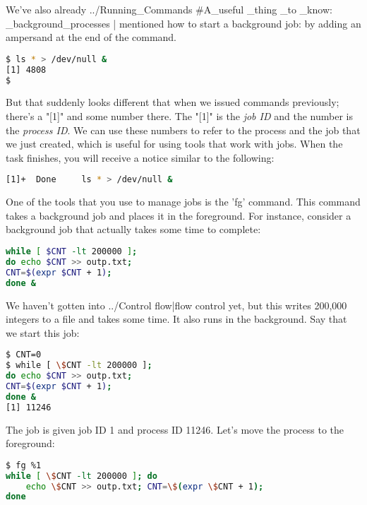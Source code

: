 We've also already ../Running\_Commands \#A\_useful \_thing \_to \_know:
\_background\_processes | mentioned how to start a background job: by adding an
ampersand at the end of the command.
\lstset{basicstyle=\scriptsize, numbers=left, captionpos=b, tabsize=4}
\begin{lstlisting}[caption=Creating a background job,language={bash},
xleftmargin=15pt,label=lst:creatingabackgroundjob]
$ ls * > /dev/null &
[1] 4808
$
\end{lstlisting}

But that suddenly looks different that when we issued commands previously;
there's a "[1]" and some number there. The "[1]" is the \textit{job ID} and the
number is the \textit{process ID}. We can use these numbers to refer to the
process and the job that we just created, which is useful for using tools that
work with jobs. When the task finishes, you will receive a notice similar to
the following:
\lstset{basicstyle=\scriptsize, numbers=left, captionpos=b, tabsize=4}
\begin{lstlisting}[caption=Job done,language={bash},
xleftmargin=15pt, label=lst:Job done]
[1]+  Done     ls * > /dev/null &
\end{lstlisting}

One of the tools that you use to manage jobs is the 'fg' command. This command
takes a background job and places it in the foreground. For instance, consider
a background job that actually takes some time to complete:
\lstset{basicstyle=\scriptsize, numbers=left, captionpos=b, tabsize=4}
\begin{lstlisting}[caption=A heftier job,language={bash},
xleftmargin=15pt, label=lst:A heftier job]
while [ $CNT -lt 200000 ];
do echo $CNT >> outp.txt;
CNT=$(expr $CNT + 1);
done &
\end{lstlisting}

We haven't gotten into ../Control flow|flow control yet, but this writes
200,000 integers to a file and takes some time. It also runs in the background.
Say that we start this job:

\lstset{basicstyle=\scriptsize, numbers=left, captionpos=b, tabsize=4}
\begin{lstlisting}[caption=Starting the job,language={bash},
xleftmargin=15pt, label=lst:Starting the job]
$ CNT=0
$ while [ \$CNT -lt 200000 ];
do echo $CNT >> outp.txt;
CNT=$(expr $CNT + 1);
done &
[1] 11246
\end{lstlisting}


The job is given job ID 1 and process ID 11246. Let's move the process to the
foreground:
\lstset{basicstyle=\scriptsize, numbers=left, captionpos=b, tabsize=4}
\begin{lstlisting}[caption=Moving the job to the front,language={bash},
xleftmargin=15pt, label=lst:Moving the job to the front]
$ fg %1
while [ \$CNT -lt 200000 ]; do
    echo \$CNT >> outp.txt; CNT=\$(expr \$CNT + 1);
done
\end{lstlisting}


